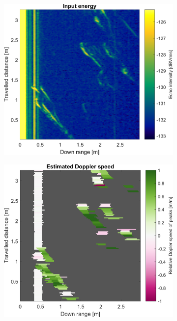 \begin{figure}[htbp]
    \centering
    \begin{subfigure}[t]{0.475\linewidth}
        \centering
        \includegraphics[width=\linewidth,max height=.475\textheight]{gfx/results/xrayroom_input.png}
    \end{subfigure}%
    \hfill%
    \begin{subfigure}[t]{0.475\linewidth}
        \centering
        \includegraphics[width=\linewidth,max height=.475\textheight]{gfx/results/xrayroom_doppler.png}

\end{subfigure}
\end{figure}
